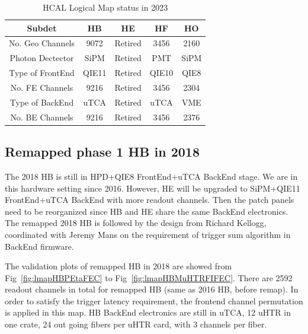 \begin{table}[htb]
\centering
\caption{
HCAL Logical Map status in 2023
}
\label{tab:2023lmaptaball}
\renewcommand{\arraystretch}{1.30}
 \begin{tabular}{ccccc}
  \hline
   Subdet & HB & HE & HF & HO \\
  \hline
   No. Geo Channels  & 9072  & Retired & 3456  & 2160 \\
   Photon Dectector  & SiPM  & Retired & PMT   & SiPM \\
   Type of FrontEnd  & QIE11 & Retired & QIE10 & QIE8 \\
   No. FE Channels   & 9216  & Retired & 3456  & 2304 \\
   Type of BackEnd   & uTCA  & Retired & uTCA  & VME  \\
   No. BE Channels   & 9216  & Retired & 3456  & 2376 \\
  \hline
 \end{tabular}
\end{table}
\clearpage

\subsection{Remapped phase 1 HB in 2018}
The 2018 HB is still in HPD+QIE8 FrontEnd+uTCA BackEnd stage. We are in this hardware setting since 2016. However, HE will be upgraded to SiPM+QIE11 FrontEnd+uTCA BackEnd with more readout channels. Then the patch panels need to be reorganized since HB and HE share the same BackEnd electronics. The remapped 2018 HB is followed by the design from Richard Kellogg, coordinated with Jeremy Mans on the requirement of trigger sum algorithm in BackEnd firmware. 

The validation plots of remapped HB in 2018 are showed from Fig~\ref{fig:lmapHBPEtaFEC} to Fig~\ref{fig:lmapHBMuHTRFIFEC}. There are 2592 readout channels in total for remapped HB (same as 2016 HB, before remap). In order to satisfy the trigger latency requirement, the frontend channel permutation is applied in this map. HB BackEnd electronics are still in uTCA, 12 uHTR in one crate, 24 out going fibers per uHTR card, with 3 channels per fiber. 
\clearpage

